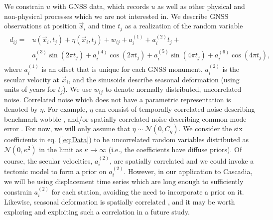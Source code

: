 \documentclass[extra,mreferee]{gji}
\begin{document}
We constrain $u$ with GNSS data, which records $u$ as well as other physical and non-physical processes which we are not interested in. We describe GNSS observations at position $\vec{x}_i$ and time $t_j$ as a realization of the random variable 
\begin{align}\label{eq:Data}
\begin{split}
d_{ij} = &u(\vec{x}_i,t_j) + \eta(\vec{x}_i,t_j) + w_{ij} + a^{(1)}_i + a^{(2)}_it_j + \\
         &a^{(3)}_i\sin(2 \pi t_j) + a^{(4)}_i\cos(2 \pi t_j) + a^{(5)}_i\sin(4 \pi t_j) + a^{(6)}_i\cos(4 \pi t_j), 
\end{split}
\end{align}
where $a^{(1)}_{i}$ is an offset that is unique for each GNSS monument, $a^{(2)}_{i}$ is the secular velocity at $\vec{x}_i$, and the sinusoids describe seasonal deformation (using units of years for $t_j$). We use $w_{ij}$ to denote normally distributed, uncorrelated noise. Correlated noise which does not have a parametric representation is denoted by $\eta$.  For example, $\eta$ can consist of temporally correlated noise describing benchmark wobble \citep[e.g.,][]{Wyatt1982,Wyatt1989}, and/or spatially correlated noise describing common mode error \citep[e.g.,][]{Wdowinski1997}. For now, we will only assume that $\eta \sim \mathcal{N}(0,C_\eta)$. We consider the six coefficients in eq. (\ref{eq:Data}) to be uncorrelated random variables distributed as $\mathcal{N}(0,\kappa^2)$ in the limit as $\kappa \to \infty$ (i.e., the coefficients have diffuse priors). Of course, the secular velocities, $a^{(2)}_{i}$, are spatially correlated and we could invoke a tectonic model to form a prior on $a^{(2)}_{i}$. However, in our application to Cascadia, we will be using displacement time series which are long enough to sufficiently constrain $a^{(2)}_{i}$ for each station, avoiding the need to incorporate a prior on it. Likewise, seasonal deformation is spatially correlated \citep{Dong2002,Langbein2008}, and it may be worth exploring and exploiting such a correlation in a future study. 
\end{document}
